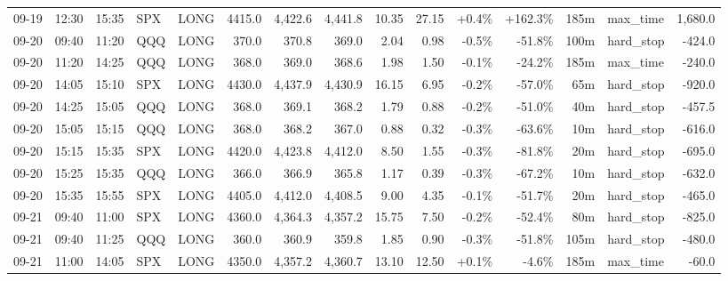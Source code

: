 \documentclass[11pt,a4paper,twoside]{article}
\begin{document}
\begin{landscape}
\begin{center}
\begin{longtable}{>{\color{txtmain}}l l l l l r r r r r r r r >{\color{txtmain}}l r}
09-19 & 12:30 & 15:35 & SPX & LONG & 4415.0 & 4,422.6 & 4,441.8 & 10.35 & 27.15 & \textcolor{wingreen}{+0.4\%} & \textcolor{wingreen}{+162.3\%} & 185m & max\_time & \textcolor{wingreen}{1,680.0} \\
09-20 & 09:40 & 11:20 & QQQ & LONG & 370.0 & 370.8 & 369.0 & 2.04 & 0.98 & \textcolor{lossred}{-0.5\%} & \textcolor{lossred}{-51.8\%} & 100m & hard\_stop & \textcolor{lossred}{-424.0} \\
09-20 & 11:20 & 14:25 & QQQ & LONG & 368.0 & 369.0 & 368.6 & 1.98 & 1.50 & \textcolor{lossred}{-0.1\%} & \textcolor{lossred}{-24.2\%} & 185m & max\_time & \textcolor{lossred}{-240.0} \\
09-20 & 14:05 & 15:10 & SPX & LONG & 4430.0 & 4,437.9 & 4,430.9 & 16.15 & 6.95 & \textcolor{lossred}{-0.2\%} & \textcolor{lossred}{-57.0\%} & 65m & hard\_stop & \textcolor{lossred}{-920.0} \\
09-20 & 14:25 & 15:05 & QQQ & LONG & 368.0 & 369.1 & 368.2 & 1.79 & 0.88 & \textcolor{lossred}{-0.2\%} & \textcolor{lossred}{-51.0\%} & 40m & hard\_stop & \textcolor{lossred}{-457.5} \\
09-20 & 15:05 & 15:15 & QQQ & LONG & 368.0 & 368.2 & 367.0 & 0.88 & 0.32 & \textcolor{lossred}{-0.3\%} & \textcolor{lossred}{-63.6\%} & 10m & hard\_stop & \textcolor{lossred}{-616.0} \\
09-20 & 15:15 & 15:35 & SPX & LONG & 4420.0 & 4,423.8 & 4,412.0 & 8.50 & 1.55 & \textcolor{lossred}{-0.3\%} & \textcolor{lossred}{-81.8\%} & 20m & hard\_stop & \textcolor{lossred}{-695.0} \\
09-20 & 15:25 & 15:35 & QQQ & LONG & 366.0 & 366.9 & 365.8 & 1.17 & 0.39 & \textcolor{lossred}{-0.3\%} & \textcolor{lossred}{-67.2\%} & 10m & hard\_stop & \textcolor{lossred}{-632.0} \\
09-20 & 15:35 & 15:55 & SPX & LONG & 4405.0 & 4,412.0 & 4,408.5 & 9.00 & 4.35 & \textcolor{lossred}{-0.1\%} & \textcolor{lossred}{-51.7\%} & 20m & hard\_stop & \textcolor{lossred}{-465.0} \\
09-21 & 09:40 & 11:00 & SPX & LONG & 4360.0 & 4,364.3 & 4,357.2 & 15.75 & 7.50 & \textcolor{lossred}{-0.2\%} & \textcolor{lossred}{-52.4\%} & 80m & hard\_stop & \textcolor{lossred}{-825.0} \\
09-21 & 09:40 & 11:25 & QQQ & LONG & 360.0 & 360.9 & 359.8 & 1.85 & 0.90 & \textcolor{lossred}{-0.3\%} & \textcolor{lossred}{-51.8\%} & 105m & hard\_stop & \textcolor{lossred}{-480.0} \\
09-21 & 11:00 & 14:05 & SPX & LONG & 4350.0 & 4,357.2 & 4,360.7 & 13.10 & 12.50 & \textcolor{wingreen}{+0.1\%} & \textcolor{lossred}{-4.6\%} & 185m & max\_time & \textcolor{lossred}{-60.0} \\

\end{longtable}
\end{center}
\end{landscape}
\end{document}

